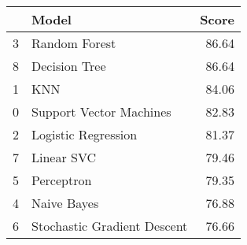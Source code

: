 \begin{tabular}{llr}
\toprule
{} &                        Model &  Score \\
\midrule
3 &                Random Forest &  86.64 \\
8 &                Decision Tree &  86.64 \\
1 &                          KNN &  84.06 \\
0 &      Support Vector Machines &  82.83 \\
2 &          Logistic Regression &  81.37 \\
7 &                   Linear SVC &  79.46 \\
5 &                   Perceptron &  79.35 \\
4 &                  Naive Bayes &  76.88 \\
6 &  Stochastic Gradient Descent &  76.66 \\
\bottomrule
\end{tabular}

